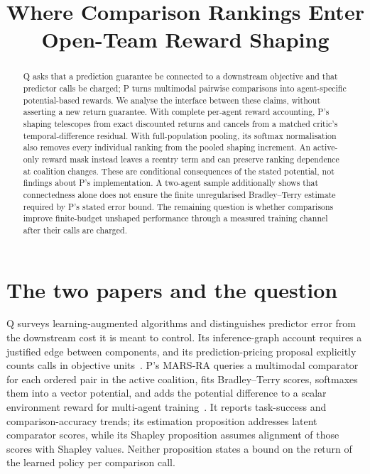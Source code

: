 \documentclass{article}
\title{Where Comparison Rankings Enter Open-Team Reward Shaping}
\begin{document}
\maketitle

\begin{abstract}
Q asks that a prediction guarantee be connected to a downstream objective and that predictor calls be
charged; P turns multimodal pairwise comparisons into agent-specific potential-based rewards.
We analyse the interface between these claims, without asserting a new return guarantee. With complete
per-agent reward accounting, P's shaping telescopes from exact discounted returns and cancels from a matched
critic's temporal-difference residual. With full-population pooling, its softmax normalisation also removes
every individual ranking from the pooled shaping increment. An active-only reward mask instead leaves a
reentry term and can preserve ranking dependence at coalition changes. These are conditional consequences of
the stated potential, not findings about P's implementation. %
A two-agent sample additionally shows that connectedness alone does not ensure the finite unregularised
Bradley--Terry estimate required by P's stated error bound. The remaining question is whether comparisons
improve finite-budget unshaped performance through a measured training channel after their calls are charged.
\end{abstract}

\section{The two papers and the question}

Q surveys learning-augmented algorithms and distinguishes predictor error from the downstream cost it is
meant to control. Its inference-graph account requires a justified edge between components, and its
prediction-pricing proposal explicitly counts calls in objective units~\cite{Q}. %
P's MARS-RA queries a multimodal comparator for each ordered pair in the active coalition, fits
Bradley--Terry scores, softmaxes them into a vector potential, and adds the potential difference to a scalar
environment reward for multi-agent training~\cite{P}. It reports task-success and comparison-accuracy trends;
its estimation proposition addresses latent comparator scores, while its Shapley proposition assumes
alignment of those scores with Shapley values. Neither proposition states a bound on the return of the
learned policy per comparison call. %
\end{document}
